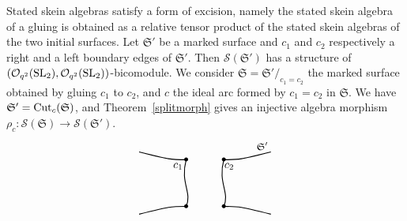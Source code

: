 \documentclass[pdftex]{sigma}%
\numberwithin{equation}{section}
\newcommand{\Oq}{\mathcal{O}_{q^2}({\rm SL}_2)}
\begin{document}
Stated skein algebras satisfy a form of excision, namely the stated skein algebra of a gluing is obtained as a relative tensor product of the stated skein algebras of the two initial surfaces.
Let $\mathfrak{S}'$ be a marked surface and $c_1$ and $c_2$ respectively a right and a left boundary edges of $\mathfrak{S}'$. Then $\mathscr{S}(\mathfrak{S}')$ has a structure of $(\Oq,\Oq)$-bicomodule. We consider $\mathfrak{S} = \mathfrak{S}'/_{c_1=c_2}$ the marked surface obtained by gluing $c_1$ to $c_2$, and $c$ the ideal arc formed by $c_1=c_2$ in $\mathfrak{S}$. We have $\mathfrak{S}' = {\rm Cut}_c(\mathfrak{S})$, and Theorem~\ref{splitmorph} gives an injective algebra morphism $\rho_c\colon\mathscr{S}(\mathfrak{S}) \to \mathscr{S}(\mathfrak{S}')$.
$$
\begin{tikzpicture}
\draw [thick] (0,2) .. controls (1,1.75) .. (1.5,1.75);
\draw [thick] (0,0) .. controls (1,0.25) .. (1.5,0.25);
\draw [thick] (1.5, 1.75) node{\small $\bullet$} .. controls (1.3,1) and (1.7,0.7) .. (1.5,0.25) node{\small $\bullet$} node[pos = 0.1,left = -2pt]{$c_1$};
\begin{scope}[xshift = 1.2cm]
\draw [thick] (3,2) .. controls (2,1.75).. (1.5,1.75) node[pos = 0.1, above]{\small $\mathfrak{S}'$};
\draw [thick] (3,0) .. controls (2,0.25).. (1.5,0.25);
\draw [thick] (1.5, 1.75) node{\small $\bullet$} .. controls (1.3,1) and (1.7,0.7) .. (1.5,0.25) node{\small $\bullet$} node[pos = 0.1,right = -2pt]{$c_2$};
\end{scope}
\end{tikzpicture}
$$
\end{document}
